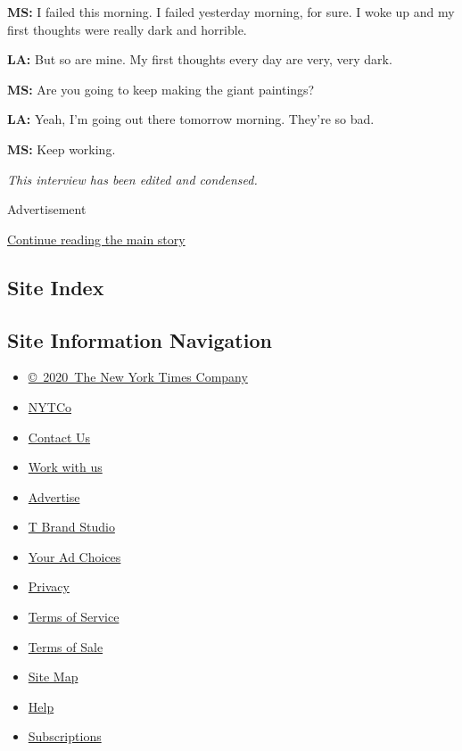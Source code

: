 \textbf{MS:} I failed this morning. I failed yesterday morning, for
sure. I woke up and my first thoughts were really dark and horrible.

\textbf{LA:} But so are mine. My first thoughts every day are very, very
dark.

\textbf{MS:} Are you going to keep making the giant paintings?

\textbf{LA:} Yeah, I'm going out there tomorrow morning. They're so bad.

\textbf{MS:} Keep working.

\emph{This interview has been edited and condensed.}

Advertisement

\protect\hyperlink{after-bottom}{Continue reading the main story}

\hypertarget{site-index}{%
\subsection{Site Index}\label{site-index}}

\hypertarget{site-information-navigation}{%
\subsection{Site Information
Navigation}\label{site-information-navigation}}

\begin{itemize}
\tightlist
\item
  \href{https://help.nytimes3xbfgragh.onion/hc/en-us/articles/115014792127-Copyright-notice}{©~2020~The
  New York Times Company}
\end{itemize}

\begin{itemize}
\tightlist
\item
  \href{https://www.nytco.com/}{NYTCo}
\item
  \href{https://help.nytimes3xbfgragh.onion/hc/en-us/articles/115015385887-Contact-Us}{Contact
  Us}
\item
  \href{https://www.nytco.com/careers/}{Work with us}
\item
  \href{https://nytmediakit.com/}{Advertise}
\item
  \href{http://www.tbrandstudio.com/}{T Brand Studio}
\item
  \href{https://www.nytimes3xbfgragh.onion/privacy/cookie-policy\#how-do-i-manage-trackers}{Your
  Ad Choices}
\item
  \href{https://www.nytimes3xbfgragh.onion/privacy}{Privacy}
\item
  \href{https://help.nytimes3xbfgragh.onion/hc/en-us/articles/115014893428-Terms-of-service}{Terms
  of Service}
\item
  \href{https://help.nytimes3xbfgragh.onion/hc/en-us/articles/115014893968-Terms-of-sale}{Terms
  of Sale}
\item
  \href{https://spiderbites.nytimes3xbfgragh.onion}{Site Map}
\item
  \href{https://help.nytimes3xbfgragh.onion/hc/en-us}{Help}
\item
  \href{https://www.nytimes3xbfgragh.onion/subscription?campaignId=37WXW}{Subscriptions}
\end{itemize}
